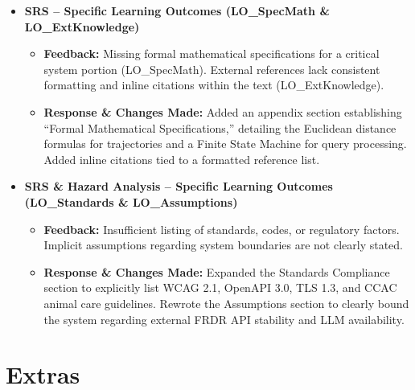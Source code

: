 \documentclass{article}
\begin{document}
\begin{itemize}
    \item \textbf{SRS -- Specific Learning Outcomes (LO\_SpecMath \& LO\_ExtKnowledge)}
    \begin{itemize}
        \item \textbf{Feedback:} Missing formal mathematical specifications for a critical system portion (LO\_SpecMath). External references lack consistent formatting and inline citations within the text (LO\_ExtKnowledge).
        \item \textbf{Response \& Changes Made:} Added an appendix section establishing ``Formal Mathematical Specifications,'' detailing the Euclidean distance formulas for trajectories and a Finite State Machine for query processing. Added inline citations tied to a formatted reference list.
    \end{itemize}

    \item \textbf{SRS \& Hazard Analysis -- Specific Learning Outcomes (LO\_Standards \& LO\_Assumptions)}
    \begin{itemize}
        \item \textbf{Feedback:} Insufficient listing of standards, codes, or regulatory factors. Implicit assumptions regarding system boundaries are not clearly stated.
        \item \textbf{Response \& Changes Made:} Expanded the Standards Compliance section to explicitly list WCAG 2.1, OpenAPI 3.0, TLS 1.3, and CCAC animal care guidelines. Rewrote the Assumptions section to clearly bound the system regarding external FRDR API stability and LLM availability.
    \end{itemize}
\end{itemize}

\section{Extras}
\end{document}
